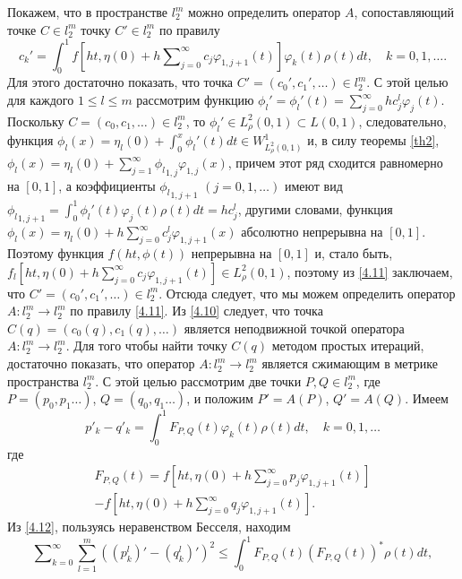 Покажем, что в пространстве $l_2^m$ можно определить   оператор $A$, сопоставляющий точке $C\in l_2^m$ точку $C'\in l_2^m$ по правилу
\begin{equation}\label{4.11}
c_k'=\int_{0}^1f\left[ht,\eta(0)+ h\sum\nolimits_{j=0}^\infty c_j
\varphi_{1,j+1}(t)\right]\varphi_k(t)\rho(t) dt,\quad k=0,1,\ldots.
\end{equation}
Для этого достаточно показать, что точка $C'=(c_0',c_1',\ldots)\in l_2^m$. С этой целью для каждого $1\le l\le m$ рассмотрим функцию
$\phi_l'=\phi_l'(t)= \sum\nolimits_{j=0}^\infty hc_j^l\varphi_j(t)$. Поскольку $C=(c_0,c_1,\ldots)\in l_2^m$, то $\phi_l'\in L^2_\rho(0,1)\subset L(0,1)$, следовательно, функция $\phi_l(x)=\eta_l(0)+\int_0^x\phi_l'(t)dt\in W^1_{L^2_\rho(0,1)}$ и, в силу теоремы \ref{th2},  $\phi_l(x)=\eta_l(0)+\sum_{j=1}^\infty{\phi_l}_{1,j}\varphi_{1,j}(x)$, причем этот ряд сходится равномерно на $[0,1]$, а  коэффициенты ${\phi_l}_{1,j+1}$ $(j=0,1,\ldots)$ имеют вид
${\phi_l}_{1,j+1}=\int_0^1\phi_l'(t)\varphi_{j}(t)\rho(t)dt=hc_j^l$, другими словами, функция
$\phi_l(x)=\eta_l(0)+h\sum_{j=0}^\infty c_j^l\varphi_{1,j+1}(x)$ абсолютно непрерывна на $[0,1]$. Поэтому функция $f(ht,\phi(t))$ непрерывна на $[0,1]$ и, стало быть,
$f_l\left[ht,\eta(0)+ h\sum\nolimits_{j=0}^\infty c_j
\varphi_{1,j+1}(t)\right]\in L^2_\rho(0,1)$, поэтому\underline{} из \eqref{4.11} заключаем, что $C'=(c_0',c_1',\ldots)\in l_2^m$. Отсюда следует, что мы можем определить  оператор $A:l_2^m\to l_2^m$ по правилу \eqref{4.11}.
Из  \eqref{4.10} следует, что точка $C(q)=(c_0(q),c_1(q),\ldots)$ является неподвижной точкой оператора $A:l_2^m\to l_2^m$. Для того чтобы найти точку $C(q)$ методом простых итераций, достаточно показать, что оператор $A:l_2^m\to l_2^m$ является сжимающим в метрике пространства $l_2^m$. С этой целью рассмотрим две точки $P,Q\in l_2^m$, где $P=(p_0,p_1\ldots)$, $Q=(q_0,q_1\ldots)$, и положим $P'=A(P)$, $Q'=A(Q)$. Имеем
\begin{equation}\label{4.12}
p'_k-q'_k=\int_{0}^1F_{P,Q}(t)\varphi_k(t)\rho(t)dt,\quad k=0,1,\ldots
\end{equation}
где
\begin{multline}\label{4.13}
F_{P,Q}(t)=f\left[ht,\eta(0)+ h\sum\nolimits_{j=0}^\infty p_j\varphi_{1,j+1}(t)\right] \\
-f\left[ht,\eta(0)+ h\sum\nolimits_{j=0}^\infty q_j\varphi_{1,j+1}(t)\right].
\end{multline}
Из \eqref{4.12}, пользуясь неравенством Бесселя, находим
\begin{equation}\label{4.14}
\sum\nolimits_{k=0}^\infty \sum_{l=1}^m((p^l_k)'-(q^l_k)')^2\le\int_{0}^1F_{P,Q}(t)(F_{P,Q}(t))^*\rho(t) dt,
\end{equation}
